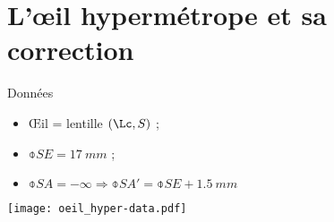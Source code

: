 \documentclass[a4paper, 12pt, final, garamond]{book}
\begin{document}
\section{L'œil hypermétrope et sa correction}
\begin{center}
    \begin{NCdefi}[width=.9\linewidth, sidebyside]{Données}
        \begin{itemize}
            \item Œil = lentille $(\Lc, S)$ ;
            \item $\obar{SE} = \SI{17}{mm}$ ;
            \item $\obar{SA} = -\infty \Rightarrow \obar{SA'} = \obar{SE} +
                \SI{1.5}{mm}$
        \end{itemize}
        \tcblower
        \begin{center}
            \texttt{[image: oeil\_hyper-data.pdf]}
        \end{center}
    \end{NCdefi}
\end{center}
\end{document}
